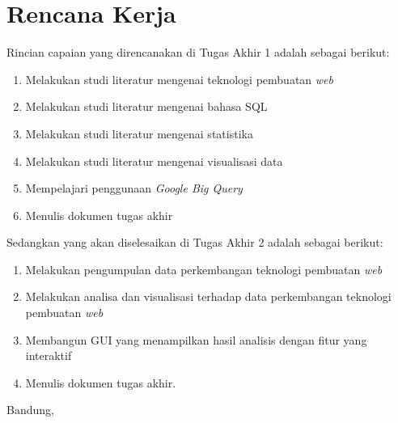 \documentclass[a4paper,twoside]{article}
\newcommand{\web}{\textit{web}\xspace}
\begin{document}
	\section{Rencana Kerja}
	Rincian capaian yang direncanakan di Tugas Akhir 1 adalah sebagai berikut:
	\begin{enumerate}
            \item Melakukan studi literatur mengenai teknologi pembuatan \web
		\item Melakukan studi literatur mengenai bahasa SQL
            \item Melakukan studi literatur mengenai statistika
		\item Melakukan studi literatur mengenai visualisasi data
		\item Mempelajari penggunaan \textit{Google Big Query}
            \item Menulis dokumen tugas akhir
	\end{enumerate}
	
	Sedangkan yang akan diselesaikan di Tugas Akhir 2 adalah sebagai berikut:
	\begin{enumerate}
            \item Melakukan pengumpulan data perkembangan teknologi pembuatan \web
		\item Melakukan analisa dan visualisasi terhadap data perkembangan teknologi pembuatan \web
		\item Membangun GUI yang menampilkan hasil analisis dengan fitur yang interaktif 
		\item Menulis dokumen tugas akhir.
	\end{enumerate}
	
	\vspace{1cm}
	\centering Bandung, \tanggal\\
	\vspace{2cm} \nama \\ 
	\vspace{1cm}
	
\end{document}
